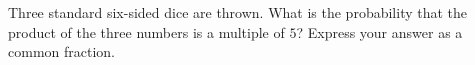 Three standard six-sided dice are thrown. What is the probability that the product of the three numbers is a multiple of $5$? Express your answer as a common fraction.
